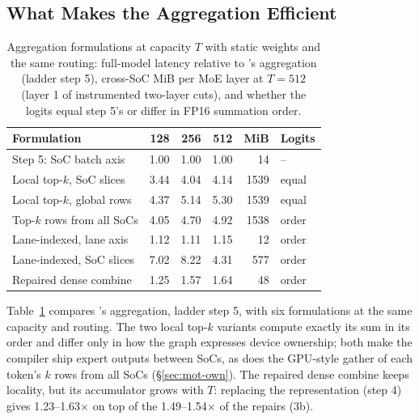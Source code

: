 \subsection{What Makes the Aggregation Efficient}
\label{sec:eval-own}

\begin{table}[t]
\caption{Aggregation formulations at capacity $T$ with static weights and the same routing: full-model latency relative to
\sys's aggregation (ladder step 5), cross-SoC MiB per MoE layer at $T=512$ (layer 1 of instrumented two-layer cuts), and
whether the logits equal step 5's or differ in FP16 summation order.}
\label{tab:own}
\vskip 0.1in
\begin{center}
\begin{footnotesize}
\setlength{\tabcolsep}{2.5pt}
\begin{tabular}{@{}lrrrrl@{}}
\toprule
Formulation & 128 & 256 & 512 & MiB & Logits \\
\midrule
Step 5: SoC batch axis        & 1.00 & 1.00 & 1.00 & 14 & -- \\
Local top-$k$, SoC slices     & 3.44 & 4.04 & 4.14 & 1539 & equal \\
Local top-$k$, global rows    & 4.37 & 5.14 & 5.30 & 1539 & equal \\
Top-$k$ rows from all SoCs    & 4.05 & 4.70 & 4.92 & 1538 & order \\
Lane-indexed, lane axis       & 1.12 & 1.11 & 1.15 & 12 & order \\
Lane-indexed, SoC slices      & 7.02 & 8.22 & 4.31 & 577 & order \\
Repaired dense combine        & 1.25 & 1.57 & 1.64 & 48 & order \\
\bottomrule
\end{tabular}
\end{footnotesize}
\end{center}
\vskip -0.15in
\end{table}

Table~\ref{tab:own} compares \sys's aggregation, ladder step 5, with six formulations at the same capacity and routing.
The two local top-$k$ variants compute exactly its sum in its order and differ only in how the graph expresses device
ownership; both make the compiler ship expert outputs between SoCs, as does the GPU-style gather of each token's $k$ rows
from all SoCs (\S\ref{sec:mot-own}). The repaired dense combine keeps locality, but its accumulator grows with $T$:
replacing the representation (step 4) gives 1.23--1.63$\times$ on top of the 1.49--1.54$\times$ of the repairs (3b).

